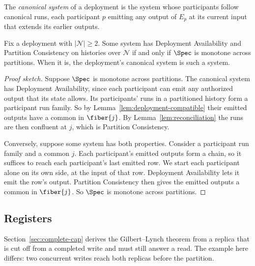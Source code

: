 The \emph{canonical system} of a deployment is the system whose participants
follow canonical runs, each participant $p$ emitting any output of $E_p$ at
its current input that extends its earlier outputs.

\begin{proposition}
\label{prop:deployment-complete-cap}
Fix a deployment with $|\mathcal N|\ge2$.  Some system has Deployment
Availability and Partition Consistency on histories over $\mathcal N$ if and
only if $\Spec$ is monotone across partitions.  When it is, the deployment's
canonical system is such a system.
\end{proposition}

\begin{proof}[Proof sketch]
Suppose $\Spec$ is monotone across partitions.  The canonical system has
Deployment Availability, since each participant can emit any authorized output
that its state allows.  Its participants' runs in a partitioned history form a
participant run family.  So by Lemma~\ref{lem:deployment-compatible} their
emitted outputs have a common \outnoun in $\fiber{j}$.  By
Lemma~\ref{lem:reconciliation} the runs are then confluent at $j$, which is
Partition Consistency.

Conversely, suppose some system has both properties.  Consider a participant
run family and a common \indesc $j$.  Each participant's emitted outputs form
a chain, so it suffices to reach each participant's last emitted row.  We
start each participant alone on its own side, at the input of that row.
Deployment Availability lets it emit the row's output.  Partition Consistency
then gives the emitted outputs a common \outnoun in $\fiber{j}$.  So $\Spec$
is monotone across partitions.
\end{proof}
\subsection{Registers}
\label{app:registers}

Section~\ref{sec:complete-cap} derives the Gilbert--Lynch theorem from a
replica that is cut off from a completed write and must still answer a read.
The example here differs: two concurrent writes reach both replicas before the
partition.

